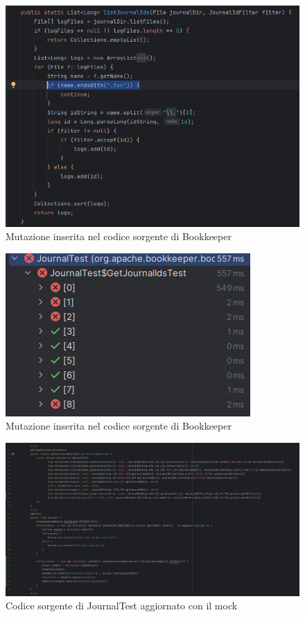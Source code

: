 \documentclass[12pt, a4paper]{article}
\begin{document}
  \begin{figure}
    \includegraphics[width=\linewidth]{./images/PitMutation1.png}
    \caption{Mutazione inserita nel codice sorgente di Bookkeeper}
    \label{fig:PitMutation1}
  \end{figure}

  \begin{figure}
    \includegraphics[width=\linewidth]{./images/PitTestFails.png}
    \caption{Mutazione inserita nel codice sorgente di Bookkeeper}
    \label{fig:PitMutation2}
  \end{figure}

  \begin{figure}
    \includegraphics[width=\linewidth]{./images/code2.png}
    \caption{Codice sorgente di JournalTest aggiornato con il mock}
    \label{fig:code2}
  \end{figure}
\end{document}
